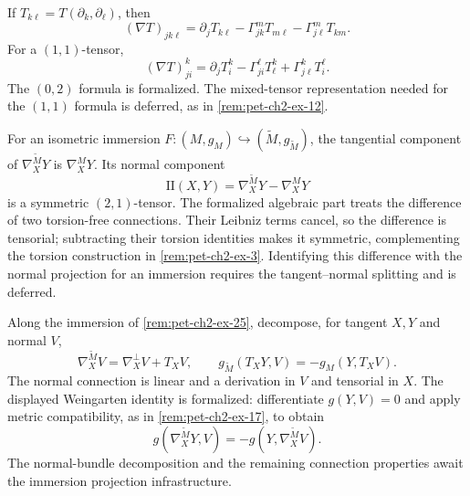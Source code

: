 \begin{remark}
  \label{rem:pet-ch2-ex-24}


  If
  $T_{k\ell}=T(\partial_k,\partial_\ell)$, then
  \[
    (\nabla T)_{jk\ell}
      =\partial_jT_{k\ell}
       -\Gamma^m_{jk}T_{m\ell}
       -\Gamma^m_{j\ell}T_{km}.
  \]
  For a $(1,1)$-tensor,
  \[
    (\nabla T)^k_{ji}
      =\partial_jT^k_i-\Gamma^\ell_{ji}T^k_\ell
       +\Gamma^k_{j\ell}T^\ell_i.
  \]
  The $(0,2)$ formula is formalized. The mixed-tensor representation needed
  for the $(1,1)$ formula is deferred, as in \cref{rem:pet-ch2-ex-12}.
\end{remark}

\begin{remark}
  \label{rem:pet-ch2-ex-25}


  For an isometric immersion
  $F:(M,g_M)\hookrightarrow(\widetilde M,g_{\widetilde M})$, the tangential
  component of $\nabla^{\widetilde M}_XY$ is $\nabla^M_XY$. Its normal
  component
  \[
    \mathrm{I\!I}(X,Y)
      =\nabla^{\widetilde M}_XY-\nabla^M_XY
  \]
  is a symmetric $(2,1)$-tensor.
  \sketch
  The formalized algebraic part treats the difference of two torsion-free
  connections. Their Leibniz terms cancel, so the difference is tensorial;
  subtracting their torsion identities makes it symmetric, complementing the
  torsion construction in \cref{rem:pet-ch2-ex-3}. Identifying this
  difference with the normal projection for an immersion requires the
  tangent--normal splitting and is deferred.
\end{remark}

\begin{remark}
  \label{rem:pet-ch2-ex-26}


  Along the immersion of
  \cref{rem:pet-ch2-ex-25}, decompose, for tangent $X,Y$ and normal $V$,
  \[
    \nabla^{\widetilde M}_XV=\nabla^\perp_XV+T_XV,
    \qquad
    g_{\widetilde M}(T_XY,V)=-g_M(Y,T_XV).
  \]
  The normal connection is linear and a derivation in $V$ and tensorial in
  $X$.
  \sketch
  The displayed Weingarten identity is formalized: differentiate
  $g(Y,V)=0$ and apply metric compatibility, as in
  \cref{rem:pet-ch2-ex-17}, to obtain
  \[
    g(\nabla^{\widetilde M}_XY,V)
      =-g(Y,\nabla^{\widetilde M}_XV).
  \]
  The normal-bundle decomposition and the remaining connection properties
  await the immersion projection infrastructure.
\end{remark}

